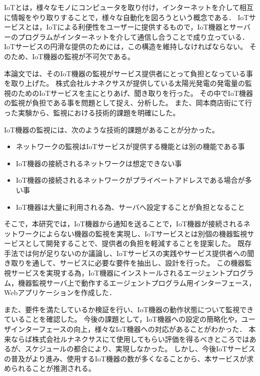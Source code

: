 
IoTとは，様々なモノにコンピュータを取り付け，インターネットを介して相互に情報をやり取りすることで，様々な自動化を図ろうという概念である．
IoTサービスとは，IoTによる利便性をユーザーに提供するもので，IoT機器とサーバーのプログラムがインターネットを介して通信し合うことで成り立っている．
IoTサービスの円滑な提供のためには，この構造を維持しなければならない。
そのため、IoT機器の監視が不可欠である。
\medskip

本論文では、そのIoT機器の監視がサービス提供者にとって負担となっている事を取り上げた。
株式会社ルナネクサスが提供している太陽光発電の発電量の監視のためのIoTサービスを主にとりあげ、聞き取りを行った。
その中でIoT機器の監視が負担である事を問題として捉え、分析した。
また、岡本商店街にて行った実験から、監視における技術的課題を明確にした。

IoT機器の監視には、次のような技術的課題があることが分かった。
\begin{itemize}
\item ネットワークの監視はIoTサービスが提供する機能とは別の機能である事
\item IoT機器の接続されるネットワークは想定できない事
\item IoT機器の接続されるネットワークがプライベートアドレスである場合が多い事
\item IoT機器は大量に利用される為、サーバへ設定することが負担となること
\end{itemize}
\medskip

そこで，本研究では，IoT機器から通知を送ることで，IoT機器が接続されるネットワークによらない機器の監視を実現し、IoTサービスとは別個の機器監視サービスとして開発することで、提供者の負担を軽減することを提案した。
既存手法では何が足りないのか議論し、IoTサービスの実践やサービス提供者への聞き取りを通して、サービスに必要な要件を抽出し、設計を行った。
この機器監視サービスを実現する為，IoT機器にインストールされるエージェントプログラム，機器監視サーバ上で動作するエージェントプログラム用インターフェース，Webアプリケーションを作成した．
\medskip

また、要件を満たしているか検証を行い、IoT機器の動作状態について監視できていることを確認した。
今後の課題として，IoT機器への設定の簡略化や，ユーザインターフェースの向上，様々なIoT機器への対応があることがわかった．
本来ならば株式会社ルナネクサスにて使用してもらい評価を得るべきところではあるが、スケジュールの都合により、実現しなかった。
しかし、今後IoTサービスの普及がより進み、使用するIoT機器の数が多くなることから、本サービスが求められることが推測される。

